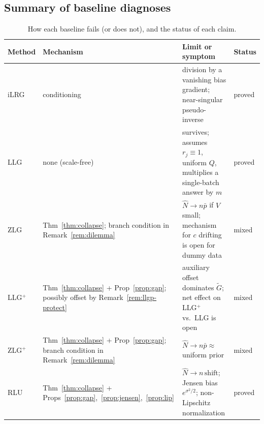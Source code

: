 \subsection{Summary of baseline diagnoses}

\begin{table}[t]
\centering
\caption{How each baseline fails (or does not), and the status of each
claim.}
\label{tab:diagnoses}
\begin{tabular}{@{}lp{3.6cm}p{6.8cm}l@{}}
\toprule
Method & Mechanism & Limit or symptom & Status \\
\midrule
iLRG & conditioning & division by a vanishing bias gradient; near-singular pseudo-inverse & proved \\
LLG & none (scale-free) & survives; assumes $r_j\equiv1$, uniform $Q$, multiplies a single-batch answer by $m$ & proved \\
ZLG & Thm~\ref{thm:collapse}; branch condition in Remark~\ref{rem:dilemma} & $\widehat N \to n\bar p$ if $V$ small; mechanism for $c$ drifting is open for dummy data & mixed \\
LLG$^+$ & Thm~\ref{thm:collapse} + Prop~\ref{prop:gap}; possibly offset by Remark~\ref{rem:llgp-protect} & auxiliary offset dominates $\widetilde G$; net effect on LLG$^+$ vs.\ LLG is open & mixed \\
ZLG$^+$ & Thm~\ref{thm:collapse} + Prop~\ref{prop:gap}; branch condition in Remark~\ref{rem:dilemma} & $\widehat N \to n\bar p \approx$ uniform prior & mixed \\
RLU & Thm~\ref{thm:collapse} + Props~\ref{prop:gap},~\ref{prop:jensen},~\ref{prop:lip} & $\widehat N \to n\,\mathrm{shift}$; Jensen bias $e^{\sigma^2/2}$; non-Lipschitz normalization & proved \\
\bottomrule
\end{tabular}
\end{table}
